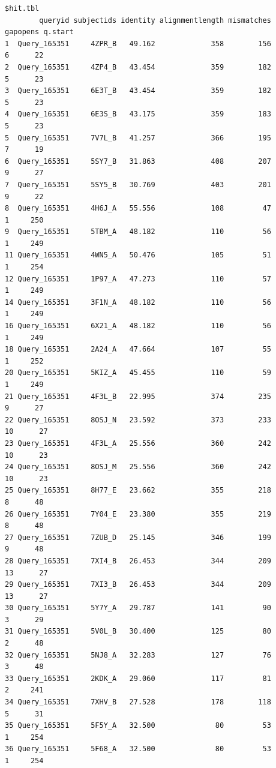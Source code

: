 \documentclass[
  letterpaper,
  DIV=11,
  numbers=noendperiod]{scrartcl}
\begin{document}
\begin{verbatim}
$hit.tbl
        queryid subjectids identity alignmentlength mismatches gapopens q.start
1  Query_165351     4ZPR_B   49.162             358        156        6      22
2  Query_165351     4ZP4_B   43.454             359        182        5      23
3  Query_165351     6E3T_B   43.454             359        182        5      23
4  Query_165351     6E3S_B   43.175             359        183        5      23
5  Query_165351     7V7L_B   41.257             366        195        7      19
6  Query_165351     5SY7_B   31.863             408        207        9      27
7  Query_165351     5SY5_B   30.769             403        201        9      22
8  Query_165351     4H6J_A   55.556             108         47        1     250
9  Query_165351     5TBM_A   48.182             110         56        1     249
11 Query_165351     4WN5_A   50.476             105         51        1     254
12 Query_165351     1P97_A   47.273             110         57        1     249
14 Query_165351     3F1N_A   48.182             110         56        1     249
16 Query_165351     6X21_A   48.182             110         56        1     249
18 Query_165351     2A24_A   47.664             107         55        1     252
20 Query_165351     5KIZ_A   45.455             110         59        1     249
21 Query_165351     4F3L_B   22.995             374        235        9      27
22 Query_165351     8OSJ_N   23.592             373        233       10      27
23 Query_165351     4F3L_A   25.556             360        242       10      23
24 Query_165351     8OSJ_M   25.556             360        242       10      23
25 Query_165351     8H77_E   23.662             355        218        8      48
26 Query_165351     7Y04_E   23.380             355        219        8      48
27 Query_165351     7ZUB_D   25.145             346        199        9      48
28 Query_165351     7XI4_B   26.453             344        209       13      27
29 Query_165351     7XI3_B   26.453             344        209       13      27
30 Query_165351     5Y7Y_A   29.787             141         90        3      29
31 Query_165351     5V0L_B   30.400             125         80        2      48
32 Query_165351     5NJ8_A   32.283             127         76        3      48
33 Query_165351     2KDK_A   29.060             117         81        2     241
34 Query_165351     7XHV_B   27.528             178        118        5      31
35 Query_165351     5F5Y_A   32.500              80         53        1     254
36 Query_165351     5F68_A   32.500              80         53        1     254

\end{verbatim}
\end{document}
